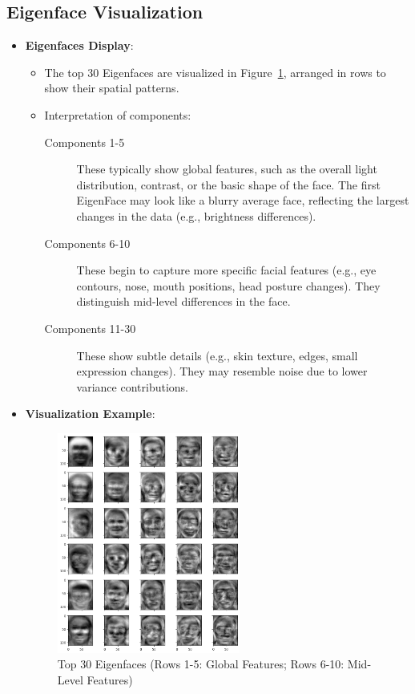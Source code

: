 \documentclass{article}
\begin{document}
	\subsection{Eigenface Visualization}
	\begin{itemize}
		\item \textbf{Eigenfaces Display}:
		\begin{itemize}
			\item The top 30 Eigenfaces are visualized in Figure~\ref{fig:eigenfaces}, arranged in rows to show their spatial patterns.
			\item Interpretation of components:
			\begin{description}
				\item[Components 1-5] These typically show global features, such as the overall light distribution, contrast, or the basic shape of the face. The first EigenFace may look like a blurry average face, reflecting the largest changes in the data\cite{Turk1991} (e.g., brightness differences).
				\item[Components 6-10] These begin to capture more specific facial features (e.g., eye contours, nose, mouth positions, head posture changes). They distinguish mid-level differences in the face.
				\item[Components 11-30] These show subtle details (e.g., skin texture, edges, small expression changes). They may resemble noise due to lower variance contributions.
			\end{description}
		\end{itemize}
		
		\item \textbf{Visualization Example}:
		\begin{figure}[h!]
			\centering
			\includegraphics[width=6cm]{eigenfaces.png}
			\caption{Top 30 Eigenfaces (Rows 1-5: Global Features; Rows 6-10: Mid-Level Features)}
			\label{fig:eigenfaces}
		\end{figure}
	\end{itemize}
	
\end{document}
